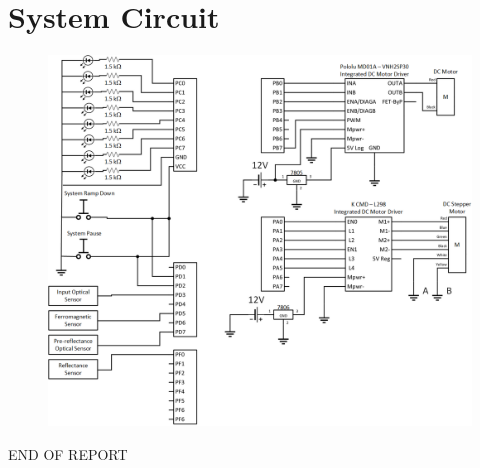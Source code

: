 \section{System Circuit}\label{sec:circuit}
\begin{figure}[tbph]
	\centering
	\includegraphics[width=1\linewidth]{"images/circuit"}
	\label{fig:ABCD}
\end{figure}

\vspace*{\fill}
\centering END OF REPORT